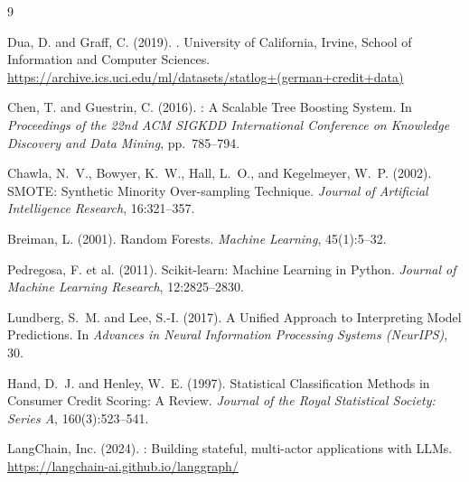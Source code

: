 \documentclass[12pt,a4paper]{article}
\theoremstyle{definition}
\begin{document}

\begin{thebibliography}{9}

  Dua, D. and Graff, C. (2019).
  .
  \newblock University of California, Irvine, School of Information and Computer Sciences.
  \newblock \url{https://archive.ics.uci.edu/ml/datasets/statlog+(german+credit+data)}

  Chen, T. and Guestrin, C. (2016).
  : A Scalable Tree Boosting System.
  \newblock In \emph{Proceedings of the 22nd ACM SIGKDD International Conference
  on Knowledge Discovery and Data Mining}, pp.\ 785--794.

  Chawla, N.~V., Bowyer, K.~W., Hall, L.~O., and Kegelmeyer, W.~P. (2002).
  \newblock SMOTE: Synthetic Minority Over-sampling Technique.
  \newblock \emph{Journal of Artificial Intelligence Research}, 16:321--357.

  Breiman, L. (2001).
  \newblock Random Forests.
  \newblock \emph{Machine Learning}, 45(1):5--32.

  Pedregosa, F. et al. (2011).
  \newblock Scikit-learn: Machine Learning in Python.
  \newblock \emph{Journal of Machine Learning Research}, 12:2825--2830.

  Lundberg, S.~M. and Lee, S.-I. (2017).
  \newblock A Unified Approach to Interpreting Model Predictions.
  \newblock In \emph{Advances in Neural Information Processing Systems (NeurIPS)}, 30.

  Hand, D.~J. and Henley, W.~E. (1997).
  \newblock Statistical Classification Methods in Consumer Credit Scoring:
  A Review.
  \newblock \emph{Journal of the Royal Statistical Society: Series A},
  160(3):523--541.

  LangChain, Inc. (2024).
  : Building stateful, multi-actor applications with LLMs.
  \newblock \url{https://langchain-ai.github.io/langgraph/}

\end{thebibliography}
\end{document}
